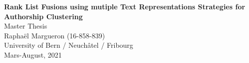 \documentclass{article}
\theoremstyle{definition}
\begin{document}
\setcounter{page}{-1}

\date{}
\author{Raphaël Margueron}

\begin{titlepage}
\vspace*{\fill}
\begin{center}
{\LARGE \textbf{Rank List Fusions using mutiple Text Representations Strategies for Authorship Clustering}}
\\[0.5cm]
{\large Master Thesis}
\\[8.0cm]
{\large Raphaël Margueron (16-858-839)}
\\[0.5cm]
{\large University of Bern / Neuchâtel / Fribourg}
\\[0.5cm]
{\large Mars-August, 2021}
\\[0.5cm]
\end{center}
\vspace*{\fill}
\end{titlepage}

\onecolumn

\vspace*{\fill}

\vspace*{\fill}
\clearpage

\vspace*{\fill}

\vspace*{\fill}
\clearpage

\tableofcontents
\clearpage

\listoftables
\clearpage

\listoffigures
\clearpage

\listoftheorems
\clearpage

\twocolumn
{}








\clearpage

\onecolumn
{}
\renewcommand{\thesubsection}{\Alph{subsection}}
\renewcommand{\thetable}{\Alph{table}}
\renewcommand{\thefigure}{\Alph{figure}}
\setcounter{subsection}{0}
\setcounter{table}{0}
\setcounter{figure}{0}


\clearpage

\end{document}
